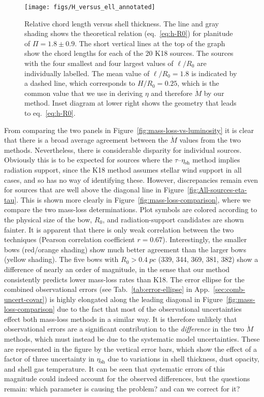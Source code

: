 \documentclass[useAMS, usenatbib, a4paper]{mnras}
\newcommand\shell{\ensuremath{_{\text{sh}}}}
\begin{document}
\begin{figure}
  \centering
  \texttt{[image: figs/H\_versus\_ell\_annotated]}
  \caption{Relative chord length versus shell thickness.  The line and
    gray shading shows the theoretical relation (eq.~\eqref{eq:h-R0})
    for planitude of \(\Pi = 1.8 \pm 0.9\).  The short vertical lines
    at the top of the graph show the chord lengths for each of the 20
    K18 sources.  The sources with the four smallest and four largest
    values of \(\ell/R_0\) are individually labelled. The mean value
    of \(\ell / R_0 = 1.8\) is indicated by a dashed line, which
    corresponds to \(H/R_0 = 0.25\), which is the common value that we
    use in deriving \(\eta\) and therefore \(\dot{M}\) by our method.
    Inset diagram at lower right shows the geometry that leads to
    eq.~\eqref{eq:h-R0}.  }
  \label{fig:H-versus-ell}
\end{figure}


From comparing the two panels in
Figure~\ref{fig:mass-loss-vs-luminosity} it is clear that there is a
broad average agreement between the \(\dot{M}\) values from the two
methods.  Nevertheless, there is considerable disparity for individual
sources.  Obviously this is to be expected for sources where the
\(\tau\)--\(\eta\shell\) method implies radiation support, since the
K18 method assumes stellar wind support in all cases, and so has no
way of identifying these.  However, discrepancies remain even for
sources that are well above the diagonal line in
Figure~\ref{fig:All-sources-eta-tau}.  This is shown more clearly in
Figure~\ref{fig:mass-loss-comparison}, where we compare the two
mass-loss determinations. Plot symbols are colored according to the
physical size of the bow, \(R_0\), and radiation-support candidates
are shown fainter.  It is apparent that there is only weak correlation
between the two techniques (Pearson correlation coefficient
\(r = 0.67\)).  Interestingly, the smaller bows (red/orange shading)
show much better agreement than the larger bows (yellow shading).  The
five bows with \(R_0 > \SI{0.4}{pc}\) (339, 344, 369, 381, 382) show a
difference of nearly an order of magnitude, in the sense that our
method consistently predicts lower mass-loss rates than K18.  The
error ellipse for the combined observational errors (see
Tab.~\ref{tab:error-ellipse} in App.~\ref{sec:comb-uncert-covar}) is
highly elongated along the leading diagonal in
Figure~\ref{fig:mass-loss-comparison} due to the fact that most of the
observational uncertainties effect both mass-loss methods in a similar
way.  It is therefore unlikely that observational errors are a
significant contribution to the \textit{difference} in the two
\(\dot M\) methods, which must instead be due to the systematic model
uncertainties.  These are represented in the figure by the vertical
error bars, which show the effect of a factor of three uncertainty in
\(\eta\shell\) due to variations in shell thickness, dust opacity, and
shell gas temperature.  It can be seen that systematic errors of this
magnitude could indeed account for the observed differences, but the
questions remain: which parameter is causing the problem? and can we
correct for it?
\end{document}
